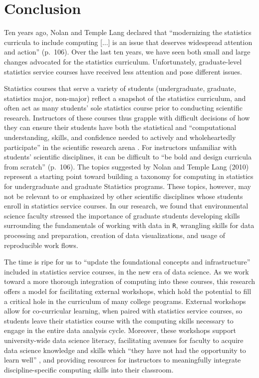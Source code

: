 \documentclass[12pt]{article}
\begin{document}
\section{Conclusion}
\label{sec:conclusion}

\noindent Ten years ago, Nolan and Temple Lang declared that ``modernizing the
statistics curricula to include computing [...] is an issue that deserves
widespread attention and action'' (p.\ 106). Over the last ten years, we have
seen both small 
and large 
changes advocated for the statistics curriculum. Unfortunately, graduate-level
statistics service courses have received less attention and pose different 
issues. 

\quad Statistics courses that serve a variety of students (undergraduate,
graduate, statistics major, non-major) reflect a snapshot of the statistics
curriculum, and often act as many students' sole statistics course prior to
conducting scientific research. Instructors of these courses thus grapple with 
difficult decisions of how they can ensure their students have both the
statistical and ``computational understanding, skills, and confidence needed to
actively and wholeheartedly participate'' in the scientific research arena 
\citep[p.\ 106]{nolan}. For instructors unfamiliar with students' scientific
disciplines, it can be difficult to ``be bold and design curricula from
scratch'' (p.\ 106). The topics suggested by Nolan and Temple Lang
(2010) represent a starting point toward building a taxonomy for computing in
statistics for undergraduate and graduate Statistics programs. These topics,
however, may not be relevant to or emphasized by other scientific disciplines
whose students enroll in statistics service courses.  In our
research, we found that environmental science faculty stressed the importance of
graduate students developing skills surrounding the fundamentals of working with
data in \texttt{R}, wrangling skills for data processing and preparation, 
creation of data visualizations, and usage of reproducible work flows. 

\quad The time is ripe for us to ``update the foundational concepts and
infrastructure'' \citep[p.\ 5]{crossroads} included in statistics service
courses, in the new era of data science. As we work toward a more thorough
integration of computing into these courses, this research offers a model for
facilitating external workshops, which hold the potential to fill a critical
hole in the curriculum of many college programs. External workshops allow for 
co-curricular learning, when paired with statistics service courses, so students
leave their statistics course with the computing skills necessary to engage in
the entire data analysis cycle. Moreover, these workshops support
university-wide data science literacy, facilitating avenues for faculty to
acquire data science knowledge and skills which ``they have not had the
opportunity to learn well'' \citep[p.\ 106]{nolan}, and providing resources for
instructors to meaningfully integrate discipline-specific computing skills into
their classroom. 
\end{document}
